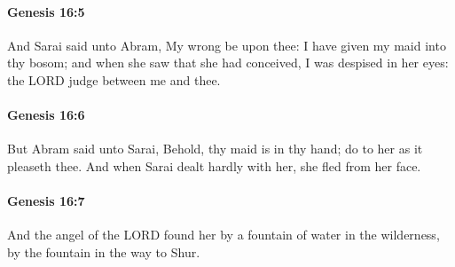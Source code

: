 		\paragraph{Genesis 16:5} %
			\label{GENESIS-16-5}

			And Sarai said unto Abram, My wrong be upon thee: I have given my maid into thy bosom; and when she saw that she had conceived, I was despised in her eyes: the LORD judge between me and thee.


		\paragraph{Genesis 16:6} %
			\label{GENESIS-16-6}

			But Abram said unto Sarai, Behold, thy maid is in thy hand; do to her as it pleaseth thee.  And when Sarai dealt hardly with her, she fled from her face.


		\paragraph{Genesis 16:7} %
			\label{GENESIS-16-7}

			And the angel of the LORD found her by a fountain of water in the wilderness, by the fountain in the way to Shur.


